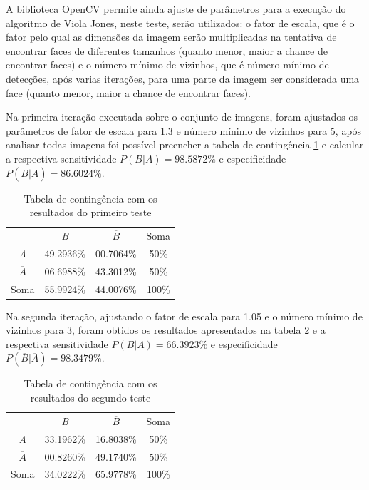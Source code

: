 A biblioteca OpenCV permite ainda ajuste de parâmetros para a execução do algoritmo de Viola Jones, neste teste, serão utilizados: o fator de escala, que é o fator pelo qual as dimensões da imagem serão multiplicadas na tentativa de encontrar faces de diferentes tamanhos (quanto menor, maior a chance de encontrar faces) e o número mínimo de vizinhos, que é número mínimo de detecções, após varias iterações, para uma parte da imagem ser considerada uma face (quanto menor, maior a chance de encontrar faces).

Na primeira iteração executada sobre o conjunto de imagens, foram ajustados os parâmetros de fator de escala para 1.3 e número mínimo de vizinhos para 5, após analisar todas imagens foi possível preencher a tabela de contingência \ref{tab:tabela_contingencia_teste1} e calcular a respectiva sensitividade $P(B|A) = 98.5872\%$ e especificidade $P(\overline{B} | \overline{A}) = 86.6024\%$.

\begin{table}[htbp]
    \caption{Tabela de contingência com os resultados do primeiro teste}
    \label{tab:tabela_contingencia_teste1}
    \centering
    \begin{tabular}{cccc}\hline\hline
        & \textit{B} & $\overline{B}$ & Soma\\
    \textit{A} & 49.2936\% & 00.7064\% & 50\% \\
    $\overline{A}$ & 06.6988\% & 43.3012\% & 50\% \\
    Soma & 55.9924\% & 44.0076\% & 100\% \\
    \hline\hline
    \end{tabular}
\end{table}

Na segunda iteração, ajustando o fator de escala para 1.05 e o número mínimo de vizinhos para 3, foram obtidos os resultados apresentados na tabela \ref{tab:tabela_contingencia_teste2} e a respectiva sensitividade $P(B|A) = 66.3923\%$ e especificidade $P(\overline{B} | \overline{A}) = 98.3479\%$.

\begin{table}[htbp]
    \caption{Tabela de contingência com os resultados do segundo teste}
    \label{tab:tabela_contingencia_teste2}
    \centering
    \begin{tabular}{cccc}\hline\hline
        & \textit{B} & $\overline{B}$ & Soma\\
    \textit{A}& 33.1962\% & 16.8038\% & 50\% \\
    $\overline{A}$& 00.8260\% & 49.1740\% & 50\% \\
    Soma& 34.0222\% & 65.9778\% & 100\% \\
    \hline\hline
    \end{tabular}
\end{table}

